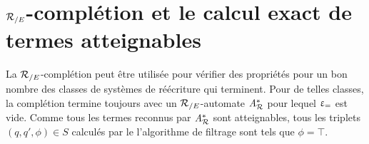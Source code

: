 





\section{${\mathcal R_{/E}}$-complétion et le calcul exact de termes atteignables}
\label{sec:exact}
La ${\mathcal R_{/E}}$-complétion peut être utilisée pour vérifier des propriétés pour un bon nombre des 
classes de systèmes de réécriture qui terminent. %
Pour de telles classes, la complétion termine toujours avec un ${\mathcal R_{/E}}$-automate ${\mathit A}_{\mathcal R}^*$ pour lequel
$\upvarepsilon_{=}$ est vide. Comme tous les termes reconnus par ${\mathit A}_{\mathcal R}^*$ sont atteignables, tous les triplets
$(q,q',\phi)\in S$ calculés par le l'algorithme de filtrage sont tels que $\phi=\top$.


